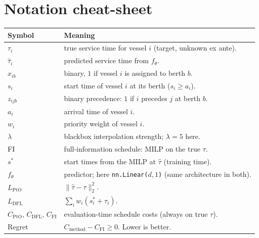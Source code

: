 \documentclass[11pt]{article}
\begin{document}
\newpage

\section*{Notation cheat-sheet}

\begin{center}
\begin{tabular}{@{}ll@{}}
\toprule
Symbol & Meaning \\
\midrule
$\tau_i$            & true service time for vessel $i$ (target, unknown ex ante). \\
$\hat{\tau}_i$      & predicted service time from $f_\theta$. \\
$x_{ib}$            & binary, $1$ if vessel $i$ is assigned to berth $b$. \\
$s_i$               & start time of vessel $i$ at its berth ($s_i \geq a_i$). \\
$z_{ijb}$           & binary precedence: $1$ if $i$ precedes $j$ at berth $b$. \\
$a_i$               & arrival time of vessel $i$. \\
$w_i$               & priority weight of vessel $i$. \\
$\lambda$           & blackbox interpolation strength; $\lambda{=}5$ here. \\
FI                  & full-information schedule: MILP on the true $\tau$. \\
$s^\ast$            & start times from the MILP at $\hat{\tau}$ (training time). \\
$f_\theta$          & predictor; here \texttt{nn.Linear($d,1$)} (same architecture in both). \\
$L_{\mathrm{PtO}}$  & $\lVert\hat{\tau}-\tau\rVert_2^2$. \\
$L_{\mathrm{DFL}}$  & $\sum_i w_i(s^\ast_i + \tau_i)$. \\
$C_{\mathrm{PtO}},\,C_{\mathrm{DFL}},\,C_{\mathrm{FI}}$
                    & evaluation-time schedule costs (always on true $\tau$). \\
Regret              & $C_{\mathrm{method}} - C_{\mathrm{FI}} \geq 0$.\;\; Lower is better. \\
\bottomrule
\end{tabular}
\end{center}

\vspace{1em}
\end{document}
